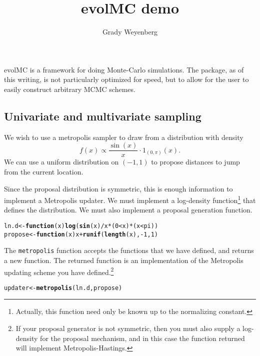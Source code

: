 \documentclass{article}\usepackage[]{graphicx}\usepackage[]{color}
\title{evolMC demo}
\author{Grady Weyenberg}
\makeatletter
\newcommand{\hlnum}[1]{\textcolor[rgb]{0.686,0.059,0.569}{#1}}%
\newcommand{\hlopt}[1]{\textcolor[rgb]{0,0,0}{#1}}%
\newcommand{\hlstd}[1]{\textcolor[rgb]{0.345,0.345,0.345}{#1}}%
\newcommand{\hlkwa}[1]{\textcolor[rgb]{0.161,0.373,0.58}{\textbf{#1}}}%
\newcommand{\hlkwb}[1]{\textcolor[rgb]{0.69,0.353,0.396}{#1}}%
\newcommand{\hlkwc}[1]{\textcolor[rgb]{0.333,0.667,0.333}{#1}}%
\newcommand{\hlkwd}[1]{\textcolor[rgb]{0.737,0.353,0.396}{\textbf{#1}}}%
\newenvironment{kframe}{%
 \def\at@end@of@kframe{}%
 \ifinner\ifhmode%
  \def\at@end@of@kframe{\end{minipage}}%
  \begin{minipage}{\columnwidth}%
 \fi\fi%
 \def\FrameCommand##1{\hskip\@totalleftmargin \hskip-\fboxsep
 \colorbox{shadecolor}{##1}\hskip-\fboxsep
     \hskip-\linewidth \hskip-\@totalleftmargin \hskip\columnwidth}%
 \MakeFramed {\advance\hsize-\width
   \@totalleftmargin\z@ \linewidth\hsize
   \@setminipage}}%
 {\par\unskip\endMakeFramed%
 \at@end@of@kframe}
\newenvironment{knitrout}{}{} %
\makeatother
\begin{document}
\maketitle
\setcounter{section}{1}
evolMC is a framework for doing Monte-Carlo simulations. The package,
as of this writing, is not particularly optimized for speed, but
to allow for the user to easily construct arbitrary MCMC schemes.

\subsection{Univariate and multivariate sampling}
We wish to use a metropolis sampler to draw from a distribution with
density \[ f(x) \propto \frac{\sin(x)}{x} \cdot 1_{(0,\pi)}(x). \] We
can use a uniform distribution on $(-1,1)$ to propose distances to
jump from the current location.

Since the proposal distribution is symmetric, this is enough
information to implement a Metropolis updater. We must implement a
log-density function\footnote{Actually, this function need only be
  known up to the normalizing constant.} that defines the
distribution. We must also implement a proposal generation function.

\begin{knitrout}
\color{fgcolor}\begin{kframe}
\begin{alltt}
\hlstd{ln.d} \hlkwb{<-} \hlkwa{function}\hlstd{(}\hlkwc{x}\hlstd{)} \hlkwd{log}\hlstd{(}\hlkwd{sin}\hlstd{(x)}\hlopt{/}\hlstd{x} \hlopt{*} \hlstd{(}\hlnum{0} \hlopt{<} \hlstd{x)} \hlopt{*} \hlstd{(x} \hlopt{<} \hlstd{pi))}
\hlstd{propose} \hlkwb{<-} \hlkwa{function}\hlstd{(}\hlkwc{x}\hlstd{) x} \hlopt{+} \hlkwd{runif}\hlstd{(}\hlkwd{length}\hlstd{(x),} \hlopt{-}\hlnum{1}\hlstd{,} \hlnum{1}\hlstd{)}
\end{alltt}
\end{kframe}
\end{knitrout}


The {\tt metropolis} function accepts the functions that we have
defined, and returns a new function. The returned function is an
implementation of the Metropolis updating scheme you have
defined.\footnote{If your proposal generator is not symmetric, then
  you must also supply a log-density for the proposal mechanism, and
  in this case the function returned will implement
  Metropolis-Hastings.}

\begin{knitrout}
\color{fgcolor}\begin{kframe}
\begin{alltt}
\hlstd{updater} \hlkwb{<-} \hlkwd{metropolis}\hlstd{(ln.d, propose)}
\end{alltt}
\end{kframe}
\end{knitrout}
\end{document}

